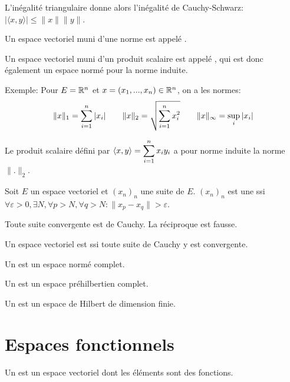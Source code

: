 L'inégalité triangulaire donne alors l'inégalité de Cauchy-Schwarz: $|\langle x,y\rangle|\le\|x\| \|y\|$.

Un espace vectoriel muni d'une norme est appelé .

Un espace vectoriel muni d'un produit scalaire est appelé , 
qui est donc également un espace normé pour la norme induite.

\medskip
Exemple:
Pour $E = \mathbb R^n$ et $x = (x_1, ..., x_n)\in\mathbb R^n$, on a les normes:
\[
\|x\|_1=\displaystyle\sum_{i=1}^n|x_i| \qquad
\|x\|_2= \sqrt{\displaystyle\sum_{i=1}^nx_i^2} \qquad
\|x\|_\infty=\sup_i|x_i|
\]

Le produit scalaire défini par $\langle x,y\rangle=\displaystyle\sum_{i=1}^nx_iy_i$ a pour norme induite
la norme $\|.\|_2$.

\medskip
Soit $E$ un espace vectoriel et $(x_n)_n$ une suite de $E$. 
$(x_n)_n$ est une  ssi 
$\forall\varepsilon>0, \exists N, \forall p> N, \forall q> N : \|x_p-x_q\|>\varepsilon$.

Toute suite convergente est de Cauchy. La réciproque est fausse.

Un espace vectoriel est  ssi toute suite de Cauchy y est convergente.

Un  est un espace normé complet.

Un  est un espace préhilbertien complet.

Un  est un espace de Hilbert 
de dimension finie.






\medskip
\section*{Espaces fonctionnels}

Un  est un espace vectoriel dont les éléments sont des
fonctions.

